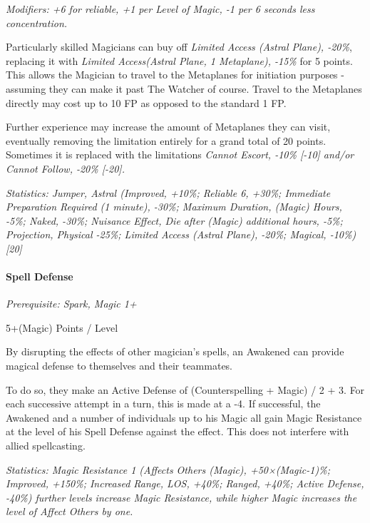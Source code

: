 \begin{multicols*}{3}
	\textit{\textcolor{NavyBlue}{Modifiers: +6 for reliable, +1 per Level of Magic, -1 per 6 seconds less concentration.}}
	
	Particularly skilled Magicians can buy off \textit{Limited Access (Astral Plane), -20\%}, replacing it with \textit{Limited Access(Astral Plane, 1 Metaplane), -15\%} for 5 points. This allows the Magician to travel to the Metaplanes for initiation purposes - assuming they can make it past The Watcher of course. Travel to the Metaplanes directly may cost up to 10 FP as opposed to the standard 1 FP. 
	
	Further experience may increase the amount of Metaplanes they can visit, eventually removing the limitation entirely for a grand total of 20 points. Sometimes it is replaced with the limitations \textit{Cannot Escort, -10\% [-10] and/or Cannot Follow, -20\% [-20].}
	
	\textit{\textcolor{OliveGreen}{Statistics: Jumper, Astral (Improved, +10\%; Reliable 6, +30\%; Immediate Preparation Required (1 minute), -30\%; Maximum Duration, (Magic) Hours, -5\%; Naked, -30\%; Nuisance Effect, Die after (Magic) additional hours, -5\%; Projection, Physical -25\%;  Limited Access (Astral Plane), -20\%; Magical, -10\%) [20]}}
	
	
	\paragraph{Spell Defense}
	\textit{Prerequisite: Spark, Magic 1+}
	\begin{flushright}
		5+(Magic) Points / Level
	\end{flushright}
	
	By disrupting the effects of other magician's spells, an Awakened can provide magical defense to themselves and their teammates.
	
	To do so, they make an Active Defense of (Counterspelling + Magic) / 2 + 3. For each successive attempt in a turn, this is made at a -4. If successful, the Awakened and a number of individuals up to his Magic all gain Magic Resistance at the level of his Spell Defense against the effect. This does not interfere with allied spellcasting.
	
	\textit{\textcolor{OliveGreen}{Statistics: Magic Resistance 1 (Affects Others (Magic), +50×(Magic-1)\%; Improved, +150\%; Increased Range, LOS, +40\%; Ranged, +40\%; Active Defense, -40\%) further levels increase Magic Resistance, while higher Magic increases the level of Affect Others by one.}}
	

\end{multicols*}
